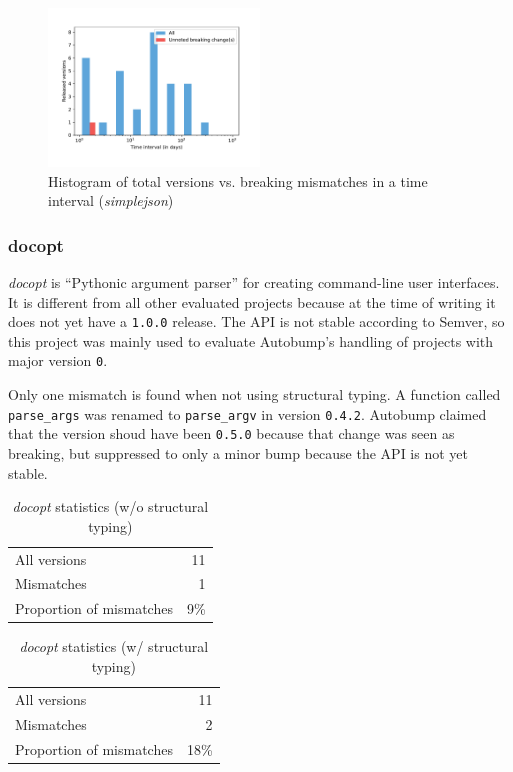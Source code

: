 \documentclass{l4proj}
\newcommand\genericstyle{\lstset{basicstyle=\ttm}}
\newcommand\codeinline[1]{{\genericstyle\lstinline!#1!}}
\begin{document}
\begin{figure}[H]
\centering
\includegraphics[width=0.5\textwidth,height=0.25\textheight]{images/evaluation/simplejson_introduced_changes}
\caption{Histogram of total versions vs. breaking mismatches in a time
interval (\textit{simplejson})}
\label{SimplejsonHistogram}
\end{figure}

\subsubsection{docopt}

\textit{docopt} is ``Pythonic argument parser'' for creating
command-line user interfaces. It is different from all other evaluated
projects because at the time of writing it does not yet have a
\codeinline{1.0.0} release. The API is not stable according to Semver,
so this project was mainly used to evaluate Autobump's handling of
projects with major version \codeinline{0}.

Only one mismatch is found when not using structural typing. A
function called \codeinline{parse_args} was renamed to
\codeinline{parse_argv} in version \codeinline{0.4.2}. Autobump
claimed that the version shoud have been \codeinline{0.5.0} because
that change was seen as breaking, but suppressed to only a minor bump
because the API is not yet stable.

\noindent
\begin{minipage}[t]{0.5\textwidth}
\begin{table}[H]
\centering
\begin{tabular}{|lr|}
All versions & 11 \\
Mismatches & 1 \\
Proportion of mismatches & 9\% \\
\end{tabular}
\caption{\textit{docopt} statistics (w/o structural typing)}
\label{DocoptNonStructural}
\end{table}
\end{minipage}
\begin{minipage}[t]{0.5\textwidth}
\begin{table}[H]
\centering
\begin{tabular}{|lr|}
All versions & 11 \\
Mismatches & 2 \\
Proportion of mismatches & 18\% \\
\end{tabular}
\caption{\textit{docopt} statistics (w/ structural typing)}
\label{DocoptStructural}
\end{table}
\end{minipage}
\end{document}
